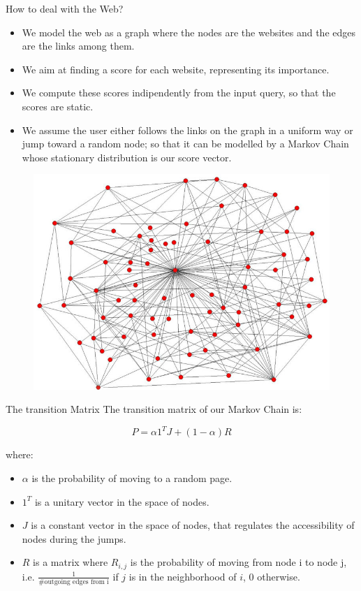 \documentclass[10pt]{beamer}
\begin{document}
\begin{frame}{How to deal with the Web?}
\begin{itemize}
\item We model the web as a graph where the nodes are the websites and the edges are the links among them.
\item We aim at finding a score for each website, representing its importance.
\item We compute these scores indipendently from the input query, so that the scores are static.
\item We assume the user either follows the links on the graph in a uniform way or jump toward a random node; so that it can be modelled by a Markov Chain whose stationary distribution is our score vector.
\end{itemize}

\begin{center}
\begin{figure}[h] 
\centering 
\includegraphics[scale=0.23]{graph}
\end{figure}
\end{center}
\end{frame}


\begin{frame}{The transition Matrix}
The transition matrix of our Markov Chain is:

$$
P = \alpha 1^T J + (1-\alpha) R
$$

where:
\begin{itemize}
\item $\alpha$ is the probability of moving to a random page.
\item $1^T$ is a unitary vector in the space of nodes.
\item $J$ is a constant vector in the space of nodes, that regulates the accessibility of nodes during the jumps.
\item $R$ is a matrix where $R_{i,j}$ is the probability of moving from node i to node j, i.e. $\frac{1}{\text{\# outgoing edges from i}}$ if $j$ is in the neighborhood of $i$, $0$ otherwise.
\end{itemize}

\end{frame}
\end{document}
